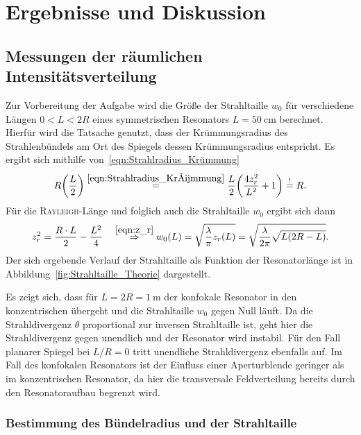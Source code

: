 \documentclass[a4paper,twoside,final]{article}
\begin{document}
\newpage
\section{Ergebnisse und Diskussion}\label{sec:ErgebnisseUndDiskussion}

\subsection{Messungen der räumlichen Intensitätsverteilung}

Zur Vorbereitung der Aufgabe wird die Größe der Strahltaille $w_0$ für verschiedene Längen $0 < L < 2R$ eines symmetrischen Resonators $L = \SI{50}{\centi\metre}$ berechnet. Hierfür wird die Tatsache genutzt, dass der Krümmungsradius des Strahlenbündels am Ort des Spiegels dessen Krümmungsradius entspricht. Es ergibt sich mithilfe von~\eqref{eqn:Strahlradius_Krümmung}
\begin{align}
  R\qty(\frac{L}{2}) \overset{\eqref{eqn:Strahlradius_Krümmung} }{=} \frac{L}{2} \qty(\frac{4 z_r^2}{L^2} + 1) \overset{!}{=} R.
\end{align}
Für die \textsc{Rayleigh}-Länge und folglich auch die Strahltaille $w_0$ ergibt sich dann
\begin{align}\label{eqn:Strahltaille}
  z_r^2 = \frac{R \cdot L}{2} - \frac{L^2}{4} \quad \overset{\eqref{eqn:z_r}}{\Rightarrow} w_0(L) = \sqrt{\frac{\lambda}{\pi} z_r(L)} = \sqrt{\frac{\lambda}{2\pi}\sqrt{L(2R - L)}}.
\end{align}
Der sich ergebende Verlauf der Strahltaille als Funktion der Resonatorlänge ist in Abbildung~\ref{fig:Strahltaille_Theorie} dargestellt.



Es zeigt sich, dass für $L = 2R = \SI{1}{\metre}$ der konfokale Resonator in den konzentrischen übergeht und die Strahltaille $w_0$ gegen Null läuft. Da die Strahldivergenz $\theta$ proportional zur inversen Strahltaille ist, geht hier die Strahldivergenz gegen unendlich und der Resonator wird instabil. Für den Fall planarer Spiegel bei $L/R = 0$ tritt unendliche Strahldivergenz ebenfalls auf. Im Fall des konfokalen Resonators ist der Einfluss einer Aperturblende geringer als im konzentrischen Resonator, da hier die transversale Feldverteilung bereits durch den Resonatoraufbau begrenzt wird.

\subsubsection{Bestimmung des Bündelradius und der Strahltaille}
\end{document}
